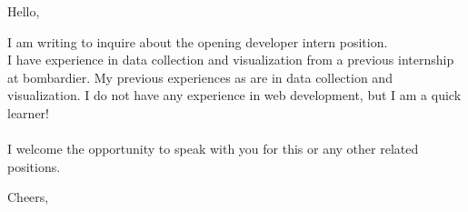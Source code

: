 \documentclass{letter}
\begin{document}

\begin{letter}{}
\address{Montréal, Canada}

\opening{Hello,}


I am writing to inquire about the opening developer intern position.\\
 I have experience in data collection and visualization from a previous internship at bombardier. My previous experiences as are in data collection and visualization. I do not have any experience in web development, but I am a quick learner!\\ \\
I welcome the opportunity to speak with you for this or any other related positions.
\signature{Maxime}

\closing{Cheers,}


\end{letter}
\end{document}
